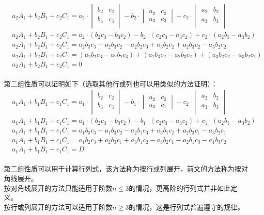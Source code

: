 \documentclass[UTF8]{ctexart}
\begin{document}
    \begin{align}
        &a_2A_1+b_2B_1+c_2C_1=a_2\cdot\begin{vmatrix}b_2&c_2\\b_3&c_3\\\end{vmatrix}-b_2\cdot\begin{vmatrix}a_2&c_2\\a_3&c_3\end{vmatrix}+c_2\cdot\begin{vmatrix}a_2&b_2\\a_3&b_3\\\end{vmatrix}\\[2mm]
        &a_2A_1+b_2B_1+c_2C_1=a_2\cdot(b_2c_3-b_3c_2)-b_2\cdot(c_2c_3-a_3c_2)+c_2\cdot(a_2b_3-a_3b_2)\\[2mm]
        &a_2A_1+b_2B_1+c_2C_1=a_2b_3c_3-a_2b_3c_2-a_2b_2c_3+a_3b_2c_2+a_2b_3c_2-a_3b_2c_2\\[2mm]
        &a_2A_1+b_2B_1+c_2C_1=(a_2b_2c_3-a_2b_2c_3)+(a_2b_3c_2-a_2b_3c_2)+(a_3b_2c_2-a_3b_2c_2)\\[2mm]
        &a_2A_1+b_2B_1+c_2C_1=0
    \end{align}\\
    第二组性质可以证明如下（选取其他行或列也可以用类似的方法证明）：\vspace{5pt}
    \setcounter{equation}{0}
    \begin{align}
        &a_1A_1+b_1B_1+c_1C_1=a_1\cdot\begin{vmatrix}b_2&c_2\\b_3&c_3\\\end{vmatrix}-b_1\cdot\begin{vmatrix}a_2&c_2\\a_3&c_1\end{vmatrix}+c_2\cdot\begin{vmatrix}a_2&b_2\\a_3&b_3\\\end{vmatrix}\\[2mm]
        &a_1A_1+b_1B_1+c_1C_1=a_1\cdot(b_2c_3-b_3c_2)-b_1\cdot(c_2c_3-a_3c_2)+c_1\cdot(a_2b_3-a_3b_2)~~\\[2mm]
        &a_1A_1+b_1B_1+c_1C_1=a_1b_3c_3-a_1b_3c_2-a_2b_1c_3+a_3b_1c_2+a_2b_3c_1-a_3b_2c_1\\[2mm]
        &a_1A_1+b_1B_1+c_1C_1=a_1b_2c_3+a_2b_3c_1+a_3b_1c_2-a_3b_2c_1-a_2b_1c_3-a_1b_3c_2\\[2mm]
        &a_1A_1+b_1B_1+c_1C_1=D
    \end{align}\\
    第二组性质可以用于计算行列式，该方法称为按行或列展开，前文的方法称为按对角线展开。\\[3mm]
    按对角线展开的方法只能适用于阶数$n\leq 3$的情况，更高阶的行列式并非如此定义。\\[3mm]
    按行或列展开的方法可以适用于阶数$n\geq 3$的情况，这是行列式普遍遵守的规律。
\end{document}
